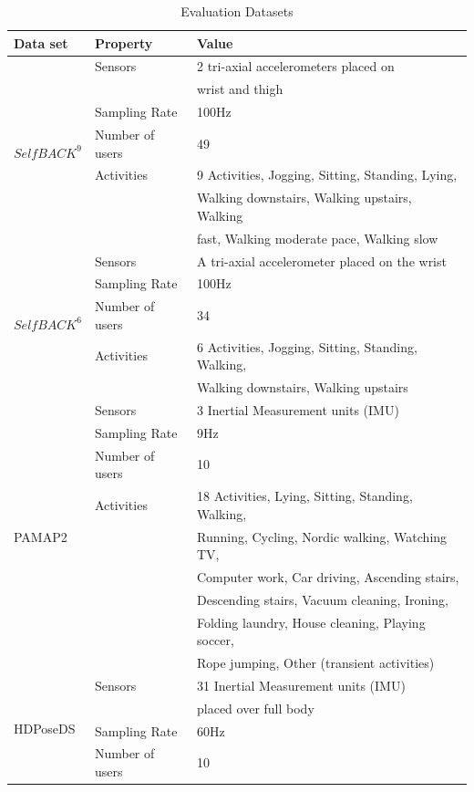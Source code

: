 \documentclass[runningheads]{llncs}
\begin{document}
\begin{table}
\caption{Evaluation Datasets}\label{tbl:data_collections}
\centering
\begin{tabular}{@{\hspace{5pt}}l@{\hspace{15pt}}l@{\hspace{15pt}}l@{\hspace{5pt}}}
\hline
Data set&Property&Value\\
\hline
\multirow{7}{*}{$SelfBACK^9$}&Sensors&2 tri-axial accelerometers placed on\\
&&wrist and thigh\\
&Sampling Rate&100Hz\\
&Number of users&49\\
&Activities&9 Activities, Jogging, Sitting, Standing, Lying, \\
&&Walking downstairs, Walking upstairs, Walking\\
&& fast, Walking moderate pace, Walking slow\\
\hline
\multirow{5}{*}{$SelfBACK^6$}&Sensors&A tri-axial accelerometer placed on the wrist\\
&Sampling Rate&100Hz\\
&Number of users&34\\
&Activities&6 Activities, Jogging, Sitting, Standing, Walking, \\
&&Walking downstairs, Walking upstairs\\
\hline
\multirow{9}{*}{PAMAP2}&Sensors&3 Inertial Measurement units (IMU)\\
&Sampling Rate&9Hz\\
&Number of users&10\\
&Activities&18 Activities, Lying, Sitting, Standing, Walking,\\
&&Running, Cycling, Nordic walking, Watching TV,\\
&&Computer work, Car driving, Ascending stairs,\\
&&Descending stairs, Vacuum cleaning, Ironing, \\
&&Folding laundry, House cleaning, Playing soccer, \\
&&Rope jumping, Other (transient activities)\\
\hline
\multirow{10}{*}{HDPoseDS}&Sensors&31 Inertial Measurement units (IMU)\\
&&placed over full body\\
&Sampling Rate&60Hz\\
&Number of users&10\\

\end{tabular}
\end{table}
\end{document}
